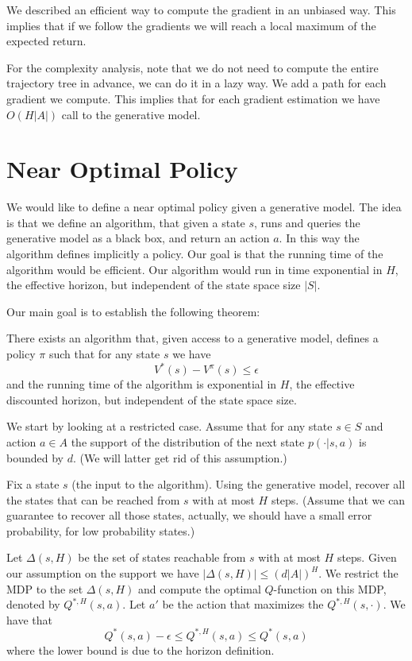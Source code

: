 We described an efficient way to compute the gradient in an unbiased
way. This implies that if we follow the gradients we will reach a
local maximum of the expected return.

For the complexity analysis, note that we do not need to compute the
entire trajectory tree in advance, we can do it in a lazy way. We
add a path for each gradient we compute. This implies that for each
gradient estimation we have $O(H|A|)$ call to the generative model.

\section{Near Optimal Policy}

We would like to define a near optimal policy given a generative
model. The idea is that we define an algorithm, that given a state
$s$, runs and queries the generative model as a black box, and
return an action $a$. In this way the algorithm defines implicitly a
policy. Our goal is that the running time of the algorithm would be
efficient. Our algorithm would run in time exponential in $H$, the
effective horizon, but independent of the state space size $|S|$.

Our main goal is to establish the following theorem:

\begin{theorem}
There exists an algorithm that,  given access to a generative model,
defines a policy $\pi$ such that for any state $s$ we have
\[
V^*(s)-V^\pi(s)\leq \epsilon
\]
and the running time of the algorithm is exponential in $H$, the
effective discounted horizon, but independent of the state space
size.
\end{theorem}

We start by looking at a restricted case. Assume that for any state
$s\in S$ and action $a\in A$ the support of the distribution of the
next state $p(\cdot|s,a)$ is bounded by $d$. (We will latter get rid
of this assumption.)

Fix a state $s$ (the input to the algorithm). Using the generative
model, recover all the states that can be reached from $s$ with at
most $H$ steps. (Assume that we can guarantee to recover all those
states, actually, we should have a small error probability, for low
probability states.)

Let $\Delta(s,H)$ be the set of states reachable from $s$ with at
most $H$ steps. Given our assumption on the support we have
$|\Delta(s,H)|\leq (d|A|)^H $. We restrict the MDP to the set
$\Delta(s,H)$ and compute the optimal $Q$-function on this MDP,
denoted by $Q^{*,H}(s,a)$. Let $a'$ be the action that maximizes the
$Q^{*,H}(s,\cdot)$. We have that
\[
Q^*(s,a)-\epsilon \leq Q^{*,H}(s,a)\leq Q^*(s,a)
\]
where the lower bound is due to the horizon definition.

